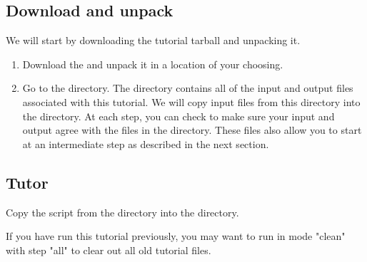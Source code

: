 \subsection{Download and unpack}

We will start by downloading the tutorial tarball and unpacking it.

\begin{enumerate}
\item Download the 
  and unpack it in a location of your choosing.

  \begin{screen}
    \shellprompt{}
  \end{screen}
  
\item Go to the  directory.
  The  directory contains all of the input and
  output files associated with this tutorial. We will copy input files
  from this directory into the  directory. At each
  step, you can check to make sure your input and output agree with
  the files in the  directory. These files also
  allow you to start at an intermediate step as described in the next
  section.

  \begin{screen}
    \shellprompt{}
  \end{screen}

\end{enumerate}

\subsection{Tutor}

Copy the  script from the 
directory into the  directory. 

\begin{tip}
  If you have run this tutorial previously, you may want to run
   in mode "clean" with step "all" to clear out all
  old tutorial files.
\end{tip}

\begin{screen}
\shellprompt{}
\shellprompt{}
\shellprompt{}
\end{screen}


